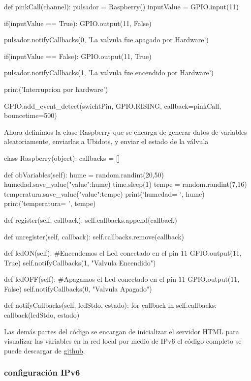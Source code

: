\documentclass[10pt]{article}\usepackage[]{graphicx}\usepackage[]{color}
\begin{document}
\begin{python}
def pinkCall(channel):
pulsador = Raspberry()
inputValue = GPIO.input(11)

if(inputValue == True):
GPIO.output(11, False)

pulsador.notifyCallbacks(0, 'La valvula fue apagado por Hardware')

if(inputValue == False):
GPIO.output(11, True)

pulsador.notifyCallbacks(1, 'La valvula fue encendido por Hardware')

print('Interrupcion por hardware')


GPIO.add_event_detect(swichtPin, GPIO.RISING, callback=pinkCall, bouncetime=500)
	
\end{python}
Ahora definimos la clase Raspberry que se encarga de generar datos de variables aleatoriamente, enviarlas a Ubidots, y enviar el estado de la válvula
\begin{python}
	class Raspberry(object):
	callbacks = []
	
	def obVariables(self):            
	hume = random.randint(20,50)
	humedad.save_value({"value":hume})
	time.sleep(1)
	tempe = random.randint(7,16)                
	temperatura.save_value({"value":tempe})                
	print('humedad= ', hume)
	print('temperatura= ', tempe)
	
	
	def register(self, callback):
	self.callbacks.append(callback)
	
	def unregister(self, callback):
	self.callbacks.remove(callback)
	
	def ledON(self):
	#Encendemos el Led conectado en el pin 11
	GPIO.output(11, True)
	self.notifyCallbacks(1, "Valvula Encendido")
	
	def ledOFF(self):
	#Apagamos el Led conectado en el pin 11
	GPIO.output(11, False)
	self.notifyCallbacks(0, "Valvula Apagado")
	
	def notifyCallbacks(self, ledStdo, estado):
	for callback in self.callbacks:
	callback(ledStdo, estado)	
\end{python}	

Las demás partes del código se encargan de inicializar el servidor HTML para visualizar las variables en la red local por medio de IPv6 el código completo se puede descargar de \href{https://github.com/wilrilo/repo_final_nube/tree/master/repo_final_nube/ProyectoF_Pi}{github}.

\subsubsection{configuración IPv6}
\end{document}
